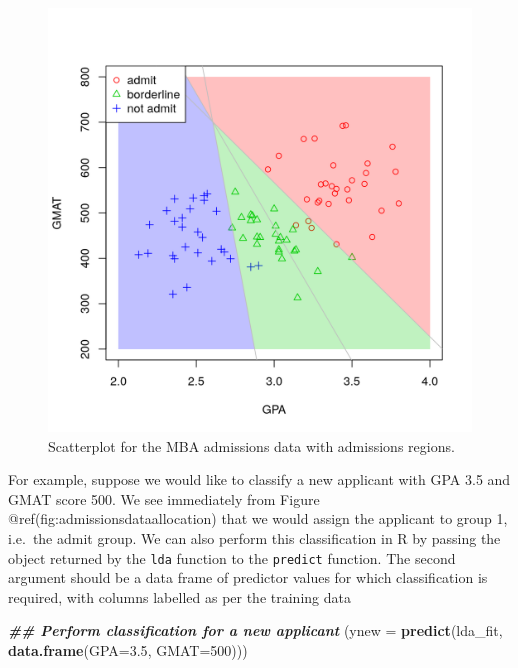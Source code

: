 \documentclass[
]{article}
\newenvironment{Shaded}{\begin{snugshade}}{\end{snugshade}}
\newcommand{\AttributeTok}[1]{\textcolor[rgb]{0.13,0.29,0.53}{#1}}
\newcommand{\DecValTok}[1]{\textcolor[rgb]{0.00,0.00,0.81}{#1}}
\newcommand{\DocumentationTok}[1]{\textcolor[rgb]{0.56,0.35,0.01}{\textbf{\textit{#1}}}}
\newcommand{\FloatTok}[1]{\textcolor[rgb]{0.00,0.00,0.81}{#1}}
\newcommand{\FunctionTok}[1]{\textcolor[rgb]{0.13,0.29,0.53}{\textbf{#1}}}
\newcommand{\NormalTok}[1]{#1}
\begin{document}
\begin{figure}[th]

{\centering \includegraphics{admissionsdataallocation-1} 

}

\caption{Scatterplot for the MBA admissions data with admissions regions.}\label{fig:admissionsdataallocation}
\end{figure}

For example, suppose we would like to classify a new applicant with GPA
3.5 and GMAT score 500. We see immediately from Figure
@ref(fig:admissionsdataallocation) that we would assign the applicant to
group 1, i.e.~the admit group. We can also perform this classification
in R by passing the object returned by the \texttt{lda} function to the
\texttt{predict} function. The second argument should be a data frame of
predictor values for which classification is required, with columns
labelled as per the training data

\begin{Shaded}
\begin{Highlighting}[]
\DocumentationTok{\#\# Perform classification for a new applicant}
\NormalTok{(}\AttributeTok{ynew =} \FunctionTok{predict}\NormalTok{(lda\_fit, }\FunctionTok{data.frame}\NormalTok{(}\AttributeTok{GPA=}\FloatTok{3.5}\NormalTok{, }\AttributeTok{GMAT=}\DecValTok{500}\NormalTok{)))}
\end{Highlighting}
\end{Shaded}
\end{document}
